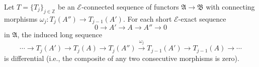 Let $T = \{T_j\}_{j \in \mathbb{Z}}$ be an $\mathcal{E}$-connected sequence of functors $\mathfrak{A} \to \mathfrak{B}$ with connecting morphisms $\omega_j : T_j(A'') \to T_{j-1}(A')$. For each short $\mathcal{E}$-exact sequence
\[
0 \to A' \to A \to A'' \to 0
\]
in $\mathfrak{A}$, the induced long sequence
\[
\cdots \to T_j(A') \to T_j(A) \to T_j(A'') \xrightarrow{\omega_j} T_{j-1}(A') \to T_{j-1}(A) \to \cdots
\]
is differential (i.e., the composite of any two consecutive morphisms is zero).
